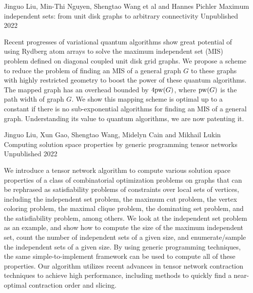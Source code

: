 \documentclass[11pt, a4paper]{awesome-cv}
\begin{document}
%
%
\begin{cventries}
  \cventry
    {Jinguo Liu, Min-Thi Nguyen, Shengtao Wang et al and Hannes Pichler} %
    {Maximum independent sets: from unit disk graphs to arbitrary connectivity} %
    {Unpublished} %
    {2022} %
    {
      \begin{cvitems} %
        {
        Recent progresses of variational quantum algorithms show great potential of using Rydberg atom arrays to solve the maximum independent set (MIS) problem defined on diagonal coupled unit disk grid graphs.
    We propose a scheme to reduce the problem of finding an MIS of a general graph $G$ to these graphs with highly restricted geometry to boost the power of these quantum algorithms.
          The mapped graph has an overhead bounded by $4 {\rm pw}(G)$, where ${\rm pw}(G)$ is the path width of graph $G$.
    We show this mapping scheme is optimal up to a constant if there is no sub-exponential algorithms for finding an MIS of a general graph.
    Understanding its value to quantum algorithms, we are now patenting it.
}
      \end{cvitems}
    }
  \cventry
    {Jinguo Liu, Xun Gao, Shengtao Wang, Midelyn Cain and Mikhail Lukin} %
    {Computing solution space properties by generic programming tensor networks} %
    {Unpublished} %
    {2022} %
    {
      \begin{cvitems} %
      {We introduce a tensor network algorithm %
to compute various solution space properties of a class of combinatorial optimization problems on graphs that can be rephrased as satisfiability problems of constraints over local sets of vertices, including the independent set problem, the maximum cut problem, the vertex coloring problem, the maximal clique problem, the dominating set problem, and the satisfiability problem, among others.
We look at the independent set problem as an example, and show how to compute the size of the maximum independent set, count the number of independent sets of a given size, and enumerate/sample the independent sets of a given size.
By using generic programming techniques, %
the same simple-to-implement framework can be used to compute all of these properties. Our algorithm utilizes recent advances in tensor network contraction techniques to achieve high performance, including methods to quickly find a near-optimal contraction order and slicing.
}
\end{cvitems}}
\end{cventries}
\end{document}

